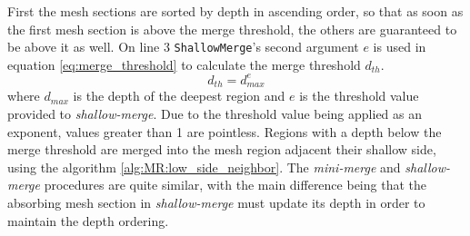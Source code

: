 First the mesh sections are sorted by depth in ascending order, so that as soon as the first mesh section is above the merge threshold, the others are guaranteed to be above it as well.
On line 3 \verb|ShallowMerge|'s second argument $e$ is used in equation \ref{eq:merge_threshold} to calculate the merge threshold $d_{th}$.
\begin{equation}\label{eq:merge_threshold}
	d_{th} = d_{max}^{e}
\end{equation}
where $d_{max}$ is the depth of the deepest region and $e$ is the threshold value provided to \textit{shallow-merge}.
Due to the threshold value being applied as an exponent, values greater than 1 are pointless.
Regions with a depth below the merge threshold are merged into the mesh region adjacent their shallow side, using the algorithm \ref{alg:MR:low_side_neighbor}.
The \textit{mini-merge} and \textit{shallow-merge} procedures are quite similar, with the main difference being that the absorbing mesh section in \textit{shallow-merge} must update its depth in order to maintain the depth ordering.

